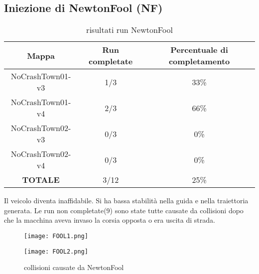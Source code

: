 \subsection{Iniezione di NewtonFool (NF)}
\begin{table}[h!]
    \begin{tabular}{|c|c|c|}
        \hline
        Mappa                   & Run completate & Percentuale di completamento\\
        \hline
        NoCrashTown01-v3        & 1/3            & 33\% \\
        NoCrashTown01-v4        & 2/3            & 66\% \\
        NoCrashTown02-v3        & 0/3            & 0\% \\
        NoCrashTown02-v4        & 0/3            & 0\%  \\
        \hline
        \textbf{TOTALE}                  & 3/12           & 25\% \\
        \hline
    \end{tabular}
    \caption{risultati run NewtonFool}
    \label{tab:nf}
\end{table}
Il veicolo diventa inaffidabile. Si ha bassa stabilità nella guida e nella traiettoria generata. Le run non completate(9) sono state tutte causate da collisioni dopo che la macchina
aveva invaso la corsia opposta o era uscita di strada. \begin{figure}[h]
    \centering
    \parbox{6cm}{
    \texttt{[image: FOOL1.png]}
    \label{fig:fool1}}
    \qquad
    \begin{minipage}{6cm}
    \texttt{[image: FOOL2.png]}
    \label{fig:fool2}
    \end{minipage}
    \caption{collisioni causate da NewtonFool}
    \label{fig:foolrun}
    \end{figure}
\newpage
